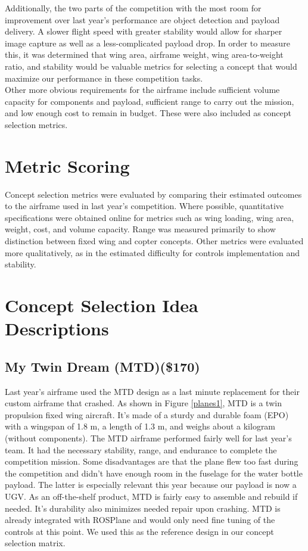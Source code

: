 \documentclass[]{auvsi_doc}
\begin{document}
Additionally, the two parts of the competition with the most room for improvement over last year's performance are object detection and payload delivery. A slower flight speed with greater stability would allow for sharper image capture as well as a less-complicated payload drop. In order to measure this, it was determined that wing area, airframe weight, wing area-to-weight ratio, and stability would be valuable metrics for selecting a concept that would maximize our performance in these competition tasks.\\

Other more obvious requirements for the airframe include sufficient volume capacity for components and payload, sufficient range to carry out the mission, and low enough cost to remain in budget. These were also included as concept selection metrics.

\section{Metric Scoring}

Concept selection metrics were evaluated by comparing their estimated outcomes to the airframe used in last year's competition. Where possible, quantitative specifications were obtained online for metrics such as wing loading, wing area, weight, cost, and volume capacity. Range was measured primarily to show distinction between fixed wing and copter concepts. Other metrics were evaluated more qualitatively, as in the estimated difficulty for controls implementation and stability.

\section{Concept Selection Idea Descriptions}

\subsection{My Twin Dream (MTD)(\$170)}

Last year's airframe used the MTD design as a last minute replacement for their custom airframe that crashed. As shown in Figure \ref{planes1}, MTD is a twin propulsion fixed wing aircraft. It's made of a sturdy and durable foam (EPO) with a wingspan of 1.8  m, a length of 1.3 m, and weighs about a kilogram (without components). The MTD airframe performed fairly well for last year's team. It had the necessary stability, range, and endurance to complete the competition mission. Some disadvantages are that the plane flew too fast during the competition and didn't have enough room in the fuselage for the water bottle payload. The latter is especially relevant this year because our payload is now a UGV. As an off-the-shelf product, MTD is fairly easy to assemble and rebuild if needed. It's durability also minimizes needed repair upon crashing. MTD is already integrated with ROSPlane and would only need fine tuning of the controls at this point. We used this as the reference design in our concept selection matrix.
\end{document}
